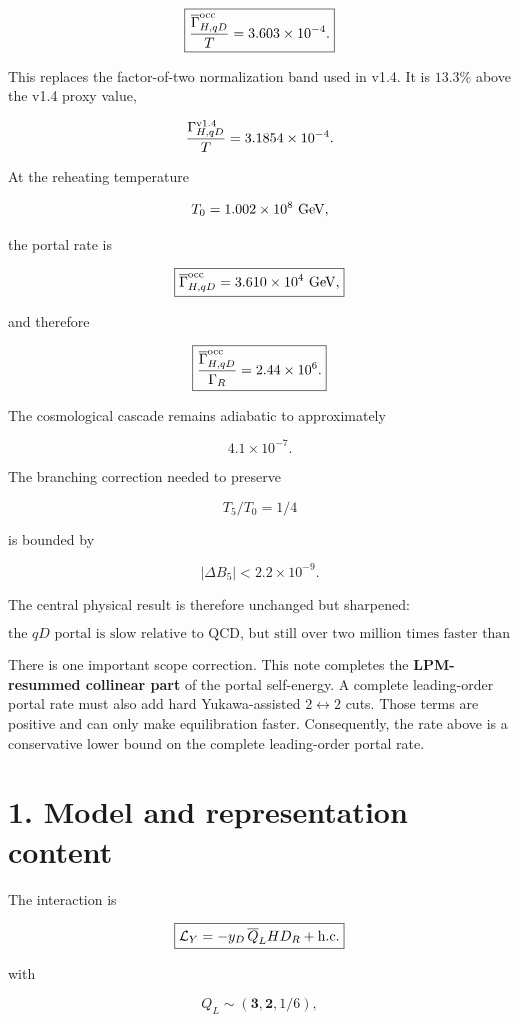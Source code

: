 \documentclass[
  10pt,
]{article}
\begin{document}
\[
\boxed{
\frac{\overline\Gamma_{H,qD}^{\rm occ}}{T}
=
3.603\times10^{-4}.
}
\]

This replaces the factor-of-two normalization band used in v1.4. It is
\(13.3\%\) above the v1.4 proxy value,

\[
\frac{\Gamma_{H,qD}^{\rm v1.4}}{T}
=
3.1854\times10^{-4}.
\]

At the reheating temperature

\[
T_0=1.002\times10^8\ {\rm GeV},
\]

the portal rate is

\[
\boxed{
\overline\Gamma_{H,qD}^{\rm occ}
=
3.610\times10^4\ {\rm GeV},
}
\]

and therefore

\[
\boxed{
\frac{\overline\Gamma_{H,qD}^{\rm occ}}
{\Gamma_R}
=
2.44\times10^6.
}
\]

The cosmological cascade remains adiabatic to approximately

\[
4.1\times10^{-7}.
\]

The branching correction needed to preserve

\[
T_5/T_0=1/4
\]

is bounded by

\[
|\Delta B_5|<2.2\times10^{-9}.
\]

The central physical result is therefore unchanged but sharpened:

\[
\boxed{
\text{the }qD\text{ portal is slow relative to QCD, but still over two million times faster than reheaton decay.}
}
\]

There is one important scope correction. This note completes the
\textbf{LPM-resummed collinear part} of the portal self-energy. A
complete leading-order portal rate must also add hard Yukawa-assisted
\(2\leftrightarrow2\) cuts. Those terms are positive and can only make
equilibration faster. Consequently, the rate above is a conservative
lower bound on the complete leading-order portal rate.

\section{1. Model and representation
content}\label{model-and-representation-content}

The interaction is

\[
\boxed{
\mathcal L_Y
=
-y_D\,\overline Q_L H D_R
+{\rm h.c.}
}
\]

with

\[
Q_L\sim(\mathbf 3,\mathbf 2,1/6),
\]
\end{document}
